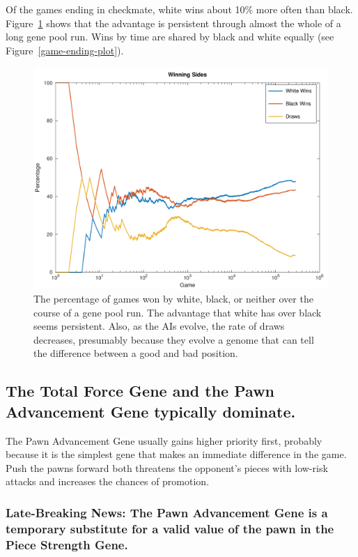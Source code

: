 \documentclass[letterpaper]{article}
\renewcommand{\_}{\allowbreak\textunderscore\allowbreak}
\begin{document}
Of the games ending in checkmate, white wins about 10\% more often than black. Figure~\ref{win-lose-plot} shows that the advantage is persistent through almost the whole of a long gene pool run. Wins by time are shared by black and white equally (see Figure~\ref{game-ending-plot}).
\begin{figure}[htb]
	\centering
	\includegraphics[width=\textwidth]{win-lose-plot}
	\caption{The percentage of games won by white, black, or neither over the course of a gene pool run. The advantage that white has over black seems persistent. Also, as the AIs evolve, the rate of draws decreases, presumably because they evolve a genome that can tell the difference between a good and bad position.}
	\label{win-lose-plot}
\end{figure}

\subsection{The Total Force Gene and the Pawn Advancement Gene typically dominate.}

The Pawn Advancement Gene usually gains higher priority first, probably because it is the simplest gene that makes an immediate difference in the game. Push the pawns forward both threatens the opponent's pieces with low-risk attacks and increases the chances of promotion.

\subsubsection{Late-Breaking News: The Pawn Advancement Gene is a temporary substitute for a valid value of the pawn in the Piece Strength Gene.}
\end{document}
